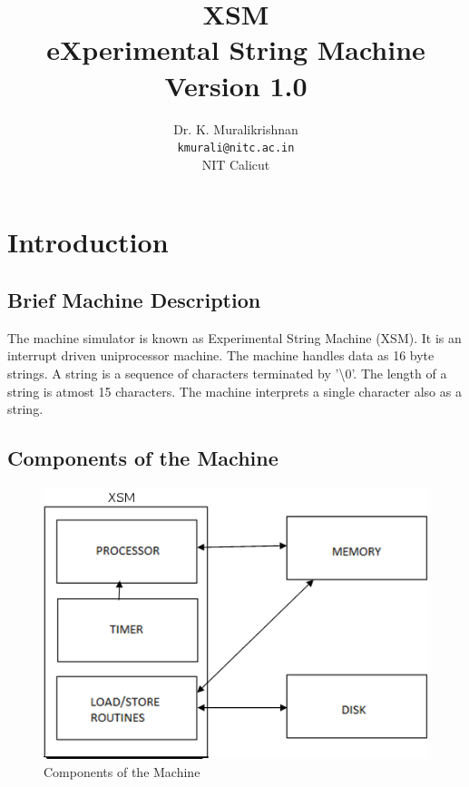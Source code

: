 \documentclass[11pt]{article}
\title{XSM \\ eXperimental String Machine \\
Version 1.0}
\author{Dr. K. Muralikrishnan  \\ \texttt{kmurali@nitc.ac.in} \\ {NIT Calicut} }
\begin{document}
\maketitle
\pagebreak

\thispagestyle{plain}

\tableofcontents
\pagebreak


\section{Introduction}

\subsection{Brief Machine Description}
The machine simulator is known as Experimental String Machine (XSM). It is an interrupt driven uniprocessor machine. The machine handles data as 16 byte strings. A string is a sequence of characters terminated by '\textbackslash 0'. The length of a string is atmost 15 characters. The machine interprets a single character also as a string.

\subsection{Components of the Machine}

\begin{figure}[hbtp]
\begin{center}
\includegraphics[scale=0.5]{block.png}
\end{center}
\caption{Components of the Machine}
\end{figure}
\end{document}
